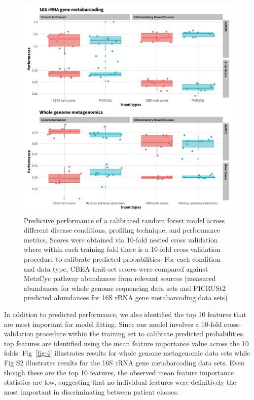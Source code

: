 \documentclass{bmcart}
\begin{document}
\begin{figure}[!h]
\includegraphics[width=0.99\linewidth]{figures/pred_performance.png}
\caption{Predictive performance of a calibrated random forest model across different disease conditions, profiling technique, and performance metrics. Scores were obtained via 10-fold nested cross validation where within each training fold there is a 10-fold cross validation procedure to calibrate predicted probabilities. For each condition and data type, CBEA trait-set scores were compared against MetaCyc pathway abundances from relevant sources (measured abundances for whole genome sequencing data sets and PICRUSt2 predicted abundances for 16S rRNA gene metabarcoding data sets)}
\label{fig:3}
\end{figure}

In addition to predicted performance, we also identified the top 10 features that are most important for model fitting. Since our model involves a 10-fold cross-validation procedure within the training set to calibrate predicted probabilities, top features are identified using the mean feature importance value across the 10 folds. Fig~\ref{fig:4} illustrates results for whole genome metagenomic data sets while Fig S2 illustrates results for the 16S rRNA gene metabarcoding data sets. Even though these are the top 10 features, the observed mean feature importance statistics are low, suggesting that no individual features were definitively the most important in discriminating between patient classes.  
\end{document}
